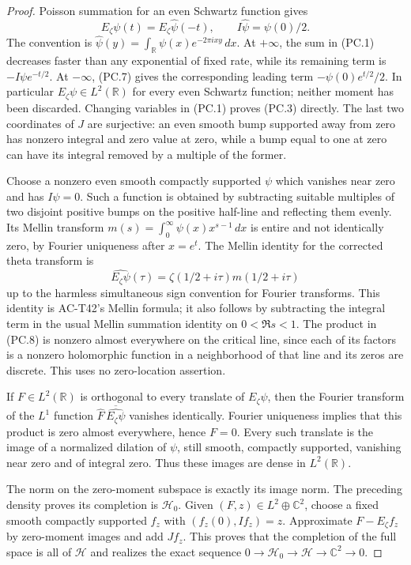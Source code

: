 \begin{proof}
Poisson summation for an even Schwartz function gives
\[
 E_\zeta\psi(t)=E_\zeta\widehat\psi(-t),\qquad
 I\widehat\psi=\psi(0)/2.
 \tag{PC.7}
\]
The convention is $\widehat\psi(y)=\int_\mathbb R
\psi(x)e^{-2\pi ixy}\,dx$.
At $+\infty$, the sum in (PC.1) decreases faster than any
exponential of fixed rate, while its remaining term is
$-I\psi e^{-t/2}$.
At $-\infty$, (PC.7) gives the corresponding leading term
$-\psi(0)e^{t/2}/2$.
In particular $E_\zeta\psi\in L^2(\mathbb R)$ for every
even Schwartz function; neither moment has been discarded.
Changing variables in (PC.1) proves (PC.3) directly.
The last two coordinates of $J$ are surjective: an even
smooth bump supported away from zero has nonzero integral
and zero value at zero, while a bump equal to one at zero
can have its integral removed by a multiple of the former.

Choose a nonzero even smooth compactly supported $\psi$
which vanishes near zero and has $I\psi=0$.
Such a function is obtained by subtracting suitable multiples
of two disjoint positive bumps on the positive half-line
and reflecting them evenly.
Its Mellin transform
$m(s)=\int_0^\infty\psi(x)x^{s-1}\,dx$ is entire and
not identically zero, by Fourier uniqueness after $x=e^t$.
The Mellin identity for the corrected theta transform is
\[
        \widehat{E_\zeta\psi}(\tau)
           =\zeta(1/2+i\tau)m(1/2+i\tau)
 \tag{PC.8}
\]
up to the harmless simultaneous sign convention for Fourier
transforms.  This identity is AC-T42's Mellin formula;
it also follows by subtracting the integral term in the
usual Mellin summation identity on $0<\Re s<1$.
The product in (PC.8) is nonzero almost everywhere on the
critical line, since each of its factors is a nonzero
holomorphic function in a neighborhood of that line and
its zeros are discrete.  This uses no zero-location assertion.

If $F\in L^2(\mathbb R)$ is orthogonal to every translate
of $E_\zeta\psi$, then the Fourier transform of the
$L^1$ function $\widehat F\,\overline{\widehat{E_\zeta\psi}}$
vanishes identically.  Fourier uniqueness implies that
this product is zero almost everywhere, hence $F=0$.
Every such translate is the image of a normalized dilation
of $\psi$, still smooth, compactly supported, vanishing
near zero and of integral zero.  Thus these images are
dense in $L^2(\mathbb R)$.

The norm on the zero-moment subspace is exactly its image
norm.  The preceding density proves its completion is
$\mathcal H_0$.  Given $(F,z)\in L^2\oplus\mathbb C^2$,
choose a fixed smooth compactly supported $f_z$ with
$(f_z(0),If_z)=z$.  Approximate $F-E_\zeta f_z$ by
zero-moment images and add $Jf_z$.
This proves that the completion of the full space is
all of $\mathcal H$ and realizes the exact sequence
$0\to\mathcal H_0\to\mathcal H\to\mathbb C^2\to0$.


\end{proof}
